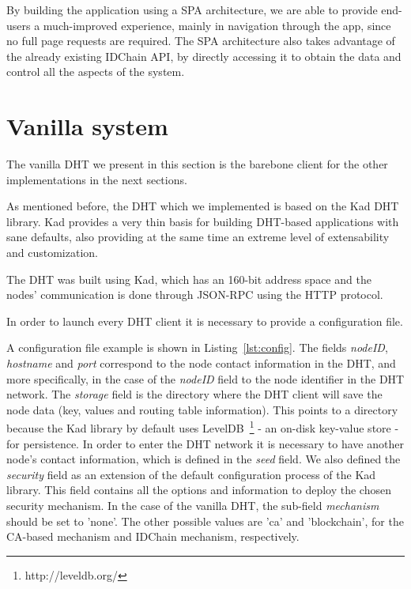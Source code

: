 By building the application using a SPA architecture, we are able to provide end-users a much-improved experience, mainly in navigation through the app, since no full page requests are required.
The \ac{SPA} architecture also takes advantage of the already existing IDChain API, by directly accessing it to obtain the data and control all the aspects of the system.

\section{Vanilla system}

The vanilla \ac{DHT} we present in this section is the barebone client for the other implementations in the next sections.

As mentioned before, the \ac{DHT} which we implemented is based on the Kad DHT library.
Kad provides a very thin basis for building DHT-based applications with sane defaults, also providing at the same time an extreme level of extensability and customization.

The DHT was built using Kad, which has an 160-bit address space and the nodes' communication is done through JSON-RPC using the \ac{HTTP} protocol.

In order to launch every DHT client it is necessary to provide a configuration file.

A configuration file example is shown in Listing~\ref{lst:config}.
The fields \textit{nodeID}, \textit{hostname} and \textit{port} correspond to the node contact information in the DHT, and more specifically, in the case of the \textit{nodeID} field to the node identifier in the DHT network.
The \textit{storage} field is the directory where the DHT client will save the node data (key, values and routing table information). This points to a directory because the Kad library by default uses LevelDB~\footnote{http://leveldb.org/} - an on-disk key-value store - for persistence.
In order to enter the DHT network it is necessary to have another node's contact information, which is defined in the \textit{seed} field.
We also defined the \textit{security} field as an extension of the default configuration process of the Kad library.
This field contains all the options and information to deploy the chosen security mechanism.
In the case of the vanilla DHT, the sub-field \textit{mechanism} should be set to 'none'.
The other possible values are 'ca' and 'blockchain', for the CA-based mechanism and IDChain mechanism, respectively.



